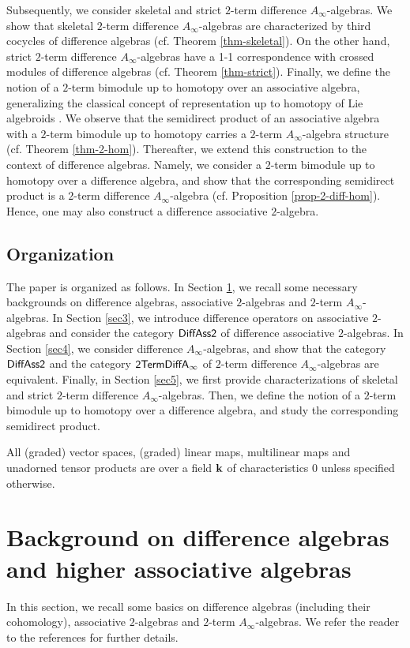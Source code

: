 \documentclass[a4paper,reqno,10pt]{amsart}
\theoremstyle{plain}
\theoremstyle{definition}
\theoremstyle{remark}
\begin{document}
\medskip

Subsequently, we consider skeletal and strict $2$-term difference $A_\infty$-algebras. We show that skeletal $2$-term difference $A_\infty$-algebras are characterized by third cocycles of difference algebras (cf. Theorem \ref{thm-skeletal}). On the other hand, strict $2$-term difference $A_\infty$-algebras have a 1-1 correspondence with crossed modules of difference algebras (cf. Theorem \ref{thm-strict}). Finally, we define the notion of a $2$-term bimodule up to homotopy over an associative algebra, generalizing the classical concept of representation up to homotopy of Lie algebroids \cite{abad-crainic,sheng-zhu}. We observe that the semidirect product of an associative algebra with a $2$-term bimodule up to homotopy carries a $2$-term $A_\infty$-algebra structure (cf. Theorem \ref{thm-2-hom}). Thereafter, we extend this construction to the context of difference algebras. Namely, we consider a $2$-term bimodule up to homotopy over a difference algebra, and show that the corresponding semidirect product is a $2$-term difference $A_\infty$-algebra (cf. Proposition \ref{prop-2-diff-hom}). Hence, one may also construct a difference associative $2$-algebra.

\subsection{Organization} The paper is organized as follows. In Section \ref{sec2}, we recall some necessary backgrounds on difference algebras, associative $2$-algebras and $2$-term $A_\infty$-algebras. In Section \ref{sec3}, we introduce difference operators on associative $2$-algebras and consider the category ${\sf DiffAss2}$ of difference associative $2$-algebras. In Section \ref{sec4}, we consider difference $A_\infty$-algebras, and show that the category ${\sf DiffAss2}$ and the category ${\sf 2TermDiffA_\infty}$ of $2$-term difference $A_\infty$-algebras are equivalent. Finally, in Section \ref{sec5}, we first provide characterizations of skeletal and strict $2$-term difference $A_\infty$-algebras. Then, we define the notion of a $2$-term bimodule up to homotopy over a difference algebra, and study the corresponding semidirect product.

\medskip

All (graded) vector spaces, (graded) linear maps, multilinear maps and unadorned tensor products are over a field ${\bf k}$ of characteristics $0$ unless specified otherwise.

\section{Background on difference algebras and higher associative algebras}\label{sec2}
In this section, we recall some basics on difference algebras (including their cohomology), associative $2$-algebras and $2$-term $A_\infty$-algebras. We refer the reader to the references \cite{das-hom,das,baez-crans,guo-li,kh} for further details.
\end{document}
